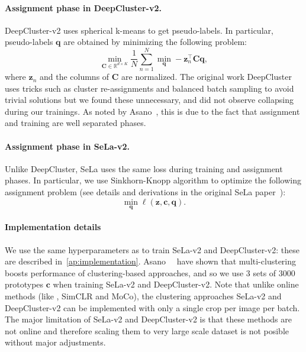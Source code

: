 \paragraph{Assignment phase in DeepCluster-v2.}
DeepCluster-v2 uses spherical k-means to get pseudo-labels.
In particular, pseudo-labels $\mathbf{q}$ are obtained by minimizing the following problem:
\begin{equation}
\label{eq:kmeans}
  \min_{\mathbf{C} \in \mathbb{R}^{d\times K}}
  \frac{1}{N}
  \sum_{n=1}^N
  \min_{\mathbf{q}}
	- \mathbf{z}_n^\top \mathbf{C} \mathbf{q},
\end{equation}
where $\mathbf{z}_n$ and the columns of $\mathbf{C}$ are normalized.
The original work DeepCluster uses tricks such as cluster re-assignments and balanced batch sampling to avoid trivial solutions but we found these unnecessary, and did not observe collapsing during our trainings.
As noted by Asano~\etal, this is due to the fact that assignment and training are well separated phases.

\paragraph{Assignment phase in SeLa-v2.}
Unlike DeepCluster, SeLa uses the same loss during training and assignment phases.
In particular, we use Sinkhorn-Knopp algorithm to optimize the following assignment problem (see details and derivations in the original SeLa paper~\cite{asano2019self}):
\begin{equation}
\min_{\mathbf{q}} \ell(\mathbf{z}, \mathbf{c}, \mathbf{q}).
\end{equation}

\paragraph{Implementation details}
We use the same hyperparameters as \OURS to train SeLa-v2 and DeepCluster-v2: these are described in~\cref{ap:implementation}.
Asano~\etal~\cite{asano2019self} have shown that multi-clustering boosts performance of clustering-based approaches, and so we use $3$ sets of $3000$ prototypes $\mathbf{c}$ when training SeLa-v2 and DeepCluster-v2.
Note that unlike online methods (like \OURS, SimCLR and MoCo), the clustering approaches SeLa-v2 and DeepCluster-v2 can be implemented with only a single crop per image per batch.
The major limitation of SeLa-v2 and DeepCluster-v2 is that these methods are not online and therefore scaling them to very large scale dataset is not posible without major adjustments.
